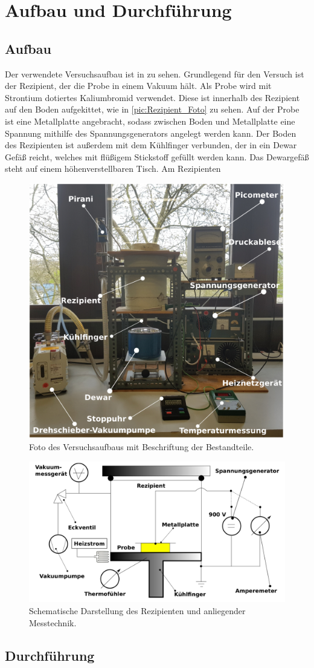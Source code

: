 \section{Aufbau und Durchführung}
\label{sec:Aufbau}
\subsection{Aufbau}
Der verwendete Versuchsaufbau ist in  zu sehen. Grundlegend für den Versuch ist der Rezipient, der die Probe in einem Vakuum hält. Als Probe wird mit Strontium dotiertes Kaliumbromid verwendet. Diese ist innerhalb des Rezipient auf den Boden aufgekittet, wie in \autoref{pic:Rezipient_Foto} zu sehen. Auf der Probe ist eine Metallplatte angebracht, sodass zwischen Boden und Metallplatte eine Spannung mithilfe des Spannungsgenerators angelegt werden kann. Der Boden des Rezipienten ist außerdem mit dem Kühlfinger verbunden, der in ein Dewar Gefäß reicht, welches mit flüßigem Stickstoff gefüllt werden kann. Das Dewargefäß steht auf einem höhenverstellbaren Tisch. Am Rezipienten 
\begin{figure}
    \centering
    \includegraphics[width=0.5\linewidth]{Bilder/Aufbau.jpeg}
    \caption{Foto des Versuchsaufbaus mit Beschriftung der Bestandteile.\cite{anleitungV48}}
    \label{pic:Aufbau_Foto}
\end{figure}
\begin{figure}
    \centering
    \includegraphics[width=0.5\linewidth]{Bilder/Rezipient.jpeg}
    \caption{Schematische Darstellung des Rezipienten und anliegender Messtechnik.\cite{anleitungV48}}
    \label{pic:Rezipient_Foto}
\end{figure}
\subsection{Durchführung}
\label{sec:Aufbau}